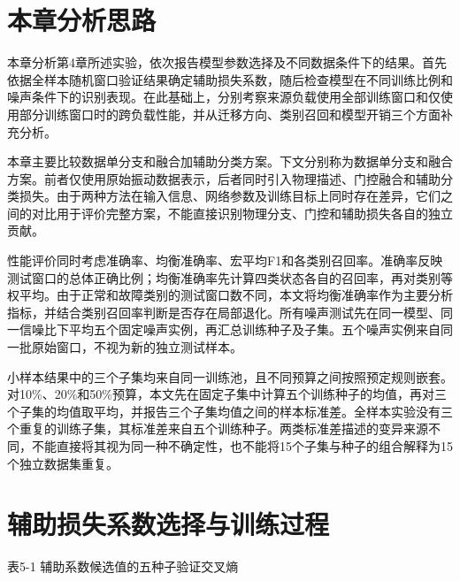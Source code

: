 \documentclass[UTF8,12pt,openany,twoside]{ctexbook}
\numberwithin{equation}{chapter}
\begin{document}
\section{本章分析思路}\label{ux672cux7ae0ux5206ux6790ux601dux8def}

本章分析第4章所述实验，依次报告模型参数选择及不同数据条件下的结果。首先依据全样本随机窗口验证结果确定辅助损失系数，随后检查模型在不同训练比例和噪声条件下的识别表现。在此基础上，分别考察来源负载使用全部训练窗口和仅使用部分训练窗口时的跨负载性能，并从迁移方向、类别召回和模型开销三个方面补充分析。

本章主要比较数据单分支和融合加辅助分类方案。下文分别称为数据单分支和融合方案。前者仅使用原始振动数据表示，后者同时引入物理描述、门控融合和辅助分类损失。由于两种方法在输入信息、网络参数及训练目标上同时存在差异，它们之间的对比用于评价完整方案，不能直接识别物理分支、门控和辅助损失各自的独立贡献。

性能评价同时考虑准确率、均衡准确率、宏平均F1和各类别召回率。准确率反映测试窗口的总体正确比例；均衡准确率先计算四类状态各自的召回率，再对类别等权平均。由于正常和故障类别的测试窗口数不同，本文将均衡准确率作为主要分析指标，并结合类别召回率判断是否存在局部退化。所有噪声测试先在同一模型、同一信噪比下平均五个固定噪声实例，再汇总训练种子及子集。五个噪声实例来自同一批原始窗口，不视为新的独立测试样本。

小样本结果中的三个子集均来自同一训练池，且不同预算之间按照预定规则嵌套。对10\%、20\%和50\%预算，本文先在固定子集中计算五个训练种子的均值，再对三个子集的均值取平均，并报告三个子集均值之间的样本标准差。全样本实验没有三个重复的训练子集，其标准差来自五个训练种子。两类标准差描述的变异来源不同，不能直接将其视为同一种不确定性，也不能将15个子集与种子的组合解释为15个独立数据集重复。

\clearpage
\section{辅助损失系数选择与训练过程}\label{ux8f85ux52a9ux635fux5931ux7cfbux6570ux9009ux62e9ux4e0eux8badux7ec3ux8fc7ux7a0b}

\begin{center}表5-1 辅助系数候选值的五种子验证交叉熵\end{center}
\end{document}
